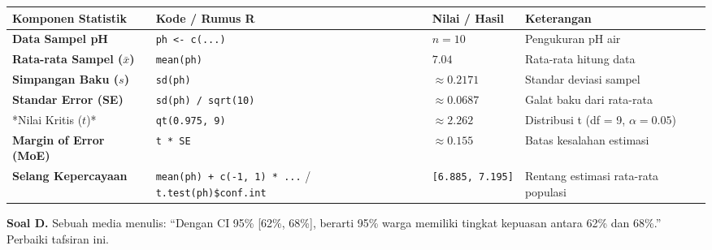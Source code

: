 \documentclass[
  indonesian,
  letterpaper,
]{book}
\newcounter{none} %
\begin{document}
{\def\LTcaptype{none} %
\begin{longtable}[]{@{}
  >{\raggedright\arraybackslash}p{}
  >{\raggedright\arraybackslash}p{}
  >{\centering\arraybackslash}p{}
  >{\raggedright\arraybackslash}p{}@{}}
\toprule\noalign{}
\begin{minipage}[b]{\linewidth}\raggedright
Komponen Statistik
\end{minipage} & \begin{minipage}[b]{\linewidth}\raggedright
Kode / Rumus R
\end{minipage} & \begin{minipage}[b]{\linewidth}\centering
Nilai / Hasil
\end{minipage} & \begin{minipage}[b]{\linewidth}\raggedright
Keterangan
\end{minipage} \\
\midrule\noalign{}
\endhead
\bottomrule\noalign{}
\endlastfoot
\textbf{Data Sampel pH} & \texttt{ph\ \textless{}-\ c(...)} & \(n = 10\)
& Pengukuran pH air \\
\textbf{Rata-rata Sampel (\(\bar{x}\))} & \texttt{mean(ph)} & \(7.04\) &
Rata-rata hitung data \\
\textbf{Simpangan Baku (\(s\))} & \texttt{sd(ph)} & \(\approx 0.2171\) &
Standar deviasi sampel \\
\textbf{Standar Error (SE)} & \texttt{sd(ph)\ /\ sqrt(10)} &
\(\approx 0.0687\) & Galat baku dari rata-rata \\
**Nilai Kritis (\(t\))* & \texttt{qt(0.975,\ 9)} & \(\approx 2.262\) &
Distribusi t (df = 9, \(\alpha = 0.05\)) \\
\textbf{Margin of Error (MoE)} & \texttt{t\ *\ SE} & \(\approx 0.155\) &
Batas kesalahan estimasi \\
\textbf{Selang Kepercayaan} & \texttt{mean(ph)\ +\ c(-1,\ 1)\ *\ ...} /
\texttt{t.test(ph)\$conf.int} & \texttt{{[}6.885,\ 7.195{]}} & Rentang
estimasi rata-rata populasi \\
\end{longtable}
}

\textbf{Soal D.} Sebuah media menulis: ``Dengan CI 95\% {[}62\%,
68\%{]}, berarti 95\% warga memiliki tingkat kepuasan antara 62\% dan
68\%.'' Perbaiki tafsiran ini.
\end{document}
